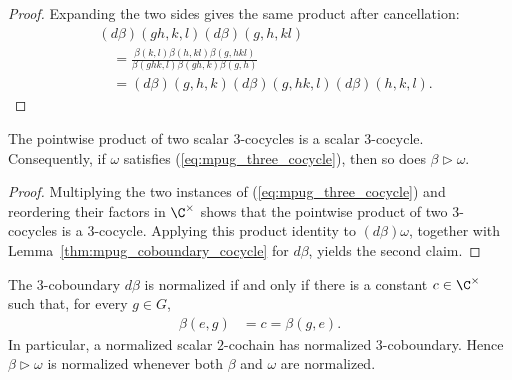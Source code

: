 \begin{proof}\leanok
    Expanding the two sides gives the same product after cancellation:
    \begin{align}
         & (d\beta)(gh,k,l)(d\beta)(g,h,kl) \\
         & \quad =
        \frac{\beta(k,l)\beta(h,kl)\beta(g,hkl)}
        {\beta(ghk,l)\beta(gh,k)\beta(g,h)} \\
         & \quad =
        (d\beta)(g,h,k)(d\beta)(g,hk,l)(d\beta)(h,k,l).
    \end{align}
\end{proof}

\begin{lemma}
    \label{thm:mpug_gauge_preserves_cocycle}
    \leanok
    The pointwise product of two scalar $3$-cocycles is a scalar
    $3$-cocycle. Consequently, if $\omega$ satisfies
    (\ref{eq:mpug_three_cocycle}), then so does
    $\beta\mathbin{\triangleright}\omega$.
\end{lemma}

\begin{proof}\leanok
    Multiplying the two instances of (\ref{eq:mpug_three_cocycle}) and
    reordering their factors in $\C^\times$ shows that the pointwise product of
    two $3$-cocycles is a $3$-cocycle. Applying this product identity to
    $(d\beta)\omega$, together with Lemma~\ref{thm:mpug_coboundary_cocycle}
    for $d\beta$, yields the second claim.
\end{proof}

\begin{lemma}
    \label{thm:mpug_gauge_preserves_normalization}
    \leanok
    The $3$-coboundary $d\beta$ is normalized if and only if there is a
    constant $c\in\C^\times$ such that, for every $g\in G$,
    \begin{align}
        \beta(e,g) & =c=\beta(g,e).
        \label{eq:mpug_coboundary_normalized_iff}
    \end{align}
    In particular, a normalized scalar $2$-cochain has normalized
    $3$-coboundary. Hence $\beta\mathbin{\triangleright}\omega$ is normalized
    whenever both $\beta$ and $\omega$ are normalized.
\end{lemma}

